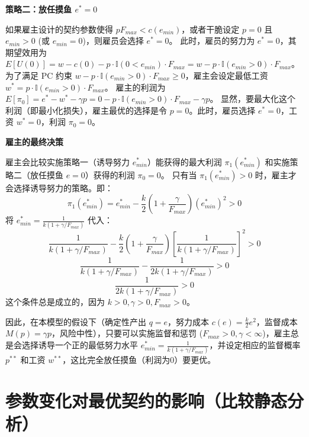 \textbf{策略二：放任摸鱼 $e^* = 0$}

如果雇主设计的契约参数使得 $p F_{max} < c(e_{min})$，或者干脆设定 $p=0$ 且 $e_{min}>0$ (或 $e_{min}=0$)，则雇员会选择 $e^*=0$。
此时，雇员的努力为 $e^*=0$，其期望效用为 $E[U(0)] = w - c(0) - p \cdot \mathbb{I}(0 < e_{min}) \cdot F_{max} = w - p \cdot \mathbb{I}(e_{min}>0) \cdot F_{max}$。
为了满足 PC 约束 $w - p \cdot \mathbb{I}(e_{min}>0) \cdot F_{max} \ge 0$，雇主会设定最低工资 $w^* = p \cdot \mathbb{I}(e_{min}>0) \cdot F_{max}$。
雇主的利润为 $E[\pi_0] = e^* - w^* - \gamma p = 0 - p \cdot \mathbb{I}(e_{min}>0) \cdot F_{max} - \gamma p$。
显然，要最大化这个利润（即最小化损失），雇主最优的选择是令 $p=0$。此时，雇员选择 $e^*=0$，工资 $w^*=0$，利润 $\pi_0 = 0$。

\textbf{雇主的最终决策}

雇主会比较实施策略一（诱导努力 $e_{min}^*$）能获得的最大利润 $\pi_1(e_{min}^*)$ 和实施策略二（放任摸鱼 $e=0$）获得的利润 $\pi_0 = 0$。
只有当 $\pi_1(e_{min}^*) > 0$ 时，雇主才会选择诱导努力的策略。即：
\begin{equation}
\pi_1(e_{min}^*) = e_{min}^* - \frac{k}{2} \left( 1 + \frac{\gamma}{F_{max}} \right) (e_{min}^*)^2 > 0
\end{equation}
将 $e_{min}^* = \frac{1}{k(1 + \gamma/F_{max})}$ 代入：
\begin{equation}
\frac{1}{k(1 + \gamma/F_{max})} - \frac{k}{2} \left( 1 + \frac{\gamma}{F_{max}} \right) \left[ \frac{1}{k(1 + \gamma/F_{max})} \right]^2 > 0
\end{equation}
\begin{equation}
\frac{1}{k(1 + \gamma/F_{max})} - \frac{1}{2k(1 + \gamma/F_{max})} > 0
\end{equation}
\begin{equation}
\frac{1}{2k(1 + \gamma/F_{max})} > 0
\end{equation}
这个条件总是成立的，因为 $k>0, \gamma>0, F_{max}>0$。

因此，在本模型的假设下（确定性产出 $q=e$，努力成本 $c(e)=\frac{k}{2}e^2$，监督成本 $M(p)=\gamma p$，风险中性），只要可以实施监督和惩罚 ($F_{max}>0, \gamma < \infty$)，雇主总是会选择诱导一个正的最低努力水平 $e_{min}^* = \frac{1}{k(1 + \gamma/F_{max})}$，并设定相应的监督概率 $p^{**}$ 和工资 $w^{**}$，这比完全放任摸鱼（利润为0）要更优。

\section{参数变化对最优契约的影响（比较静态分析）}
\label{sec:comparative_statics}

